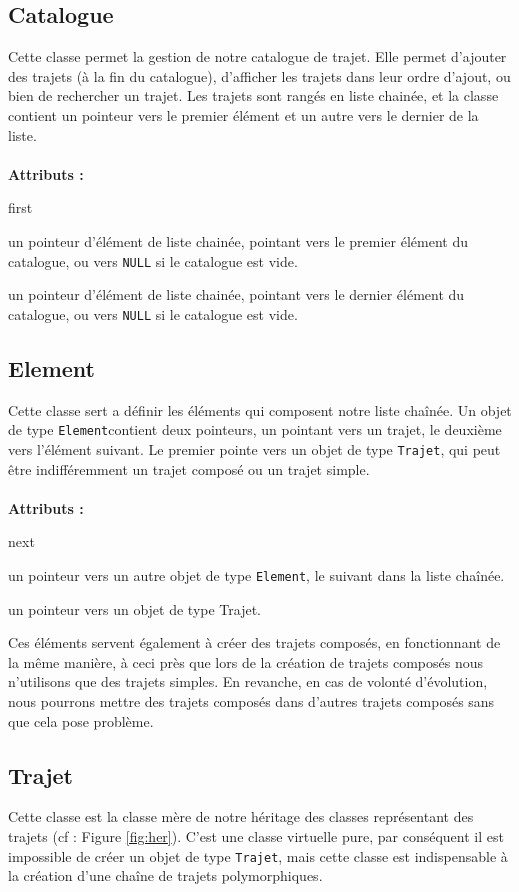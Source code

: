 \documentclass[11pt, a4paper]{article}
\begin{document}
\subsection{Catalogue}
Cette classe permet la gestion de notre catalogue de trajet. Elle permet d'ajouter des trajets (à la
fin du catalogue), d'afficher les trajets dans leur ordre d'ajout, ou bien de rechercher un trajet.
Les trajets sont rangés en liste chainée, et la classe contient un pointeur vers le premier élément
et un autre vers le dernier de la liste.\\
\\
\textbf{Attributs :}
\begin{labeling}{first}
\item [first] un pointeur d'élément de liste chainée, pointant vers le premier élément du
catalogue, ou vers \texttt{NULL} si le catalogue est vide.
\item [last] un pointeur d'élément de liste chainée, pointant vers le dernier élément du 
catalogue, ou vers \texttt{NULL} si le catalogue est vide.
\end{labeling}

\subsection{Element}
Cette classe sert a définir les éléments qui composent notre liste chaînée. Un objet de type
\texttt{Element}contient deux pointeurs, un pointant vers un trajet, le deuxième vers
l'élément suivant. Le premier pointe vers un objet de type \texttt{Trajet}, qui peut
être indifféremment un trajet composé ou un trajet simple.\\
\\
\textbf{Attributs :}
\begin{labeling}{next}
\item [next] un pointeur vers un autre objet de type \texttt{Element}, le suivant dans la liste chaînée.
\item [traj] un pointeur vers un objet de type Trajet.
\end{labeling}
Ces éléments servent également à créer des trajets composés, en fonctionnant de la même manière, à
ceci près que lors de la création de trajets composés nous n'utilisons que des trajets simples. En
revanche, en cas de volonté d'évolution, nous pourrons mettre des trajets composés dans d'autres
trajets composés sans que cela pose problème.

\subsection{Trajet}
Cette classe est la classe mère de notre héritage des classes représentant des trajets (cf : Figure
\ref{fig:her}). C'est une classe virtuelle pure, par conséquent il est impossible de créer un objet
de type \texttt{Trajet}, mais cette classe est indispensable à la création d'une chaîne de trajets
polymorphiques.
\end{document}
